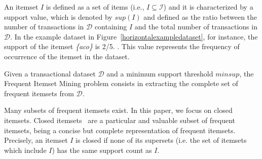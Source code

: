 
An itemset $I$ is defined as a set of items (i.e., $I\subseteq\mathcal{I}$)
and it is characterized by a support value, which is denoted by $sup(I)$ and
defined as the ratio between the number of transactions in $\mathcal{D}$
containing $I$ and the total number of transactions in $\mathcal{D}$.
In the example dataset in Figure~\ref{horizontalexampledataset}, for instance,
the support of the itemset \textit{\{aco\}} is 2/5. . This value represents the frequency of occurrence of the itemset in the dataset.

Given a transactional dataset $\mathcal{D}$ and a minimum support
threshold $minsup$, the Frequent Itemset Mining \cite{KumarBook} problem
consists in extracting the complete set of frequent itemsets
from $\mathcal{D}$.



Many subsets of frequent itemsets exist.
In this paper, we focus on closed itemsets.
Closed itemsets~\cite{ClosedPasquier1999} are a
particular and valuable subset of frequent itemsets, being
a concise but complete representation of frequent itemsets. 
Precisely, an itemset $I$ is closed if none of its supersets (i.e. the set of itemsets which include $I$) has the same support count as $I$.


